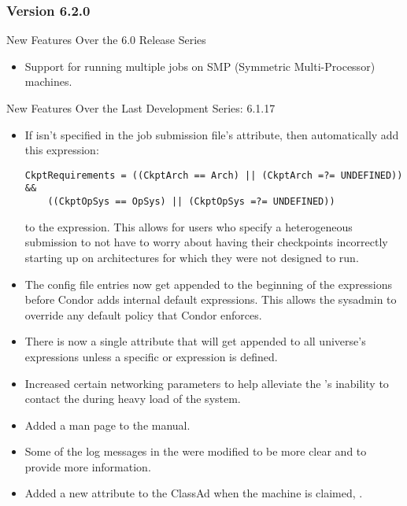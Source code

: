 \subsubsection{\label{sec:New-6-2-0}Version 6.2.0}

\noindent New Features Over the 6.0 Release Series
\begin{itemize}

\item Support for running multiple jobs on SMP (Symmetric Multi-Processor)
machines.

\end{itemize}

\noindent New Features Over the Last Development Series: 6.1.17
\begin{itemize}

\item If  isn't specified in the job submission file's
 attribute, then automatically add this expression:

\begin{verbatim}
CkptRequirements = ((CkptArch == Arch) || (CkptArch =?= UNDEFINED)) &&
	((CkptOpSys == OpSys) || (CkptOpSys =?= UNDEFINED))
\end{verbatim}

to the  expression. This allows for users who specify
a heterogeneous submission to not have to worry about having their checkpoints
incorrectly starting up on architectures for which they were not designed
to run.

\item The  config file entries now get
appended to the beginning of the expressions before Condor adds internal
default expressions.  This allows the sysadmin to override any default
policy that Condor enforces.

\item There is now a single  attribute
that will get appended to all universe's 
expressions unless a specific  or
 expression is defined.

\item Increased certain networking parameters to help alleviate the 
's inability to contact the  during heavy load
of the system.

\item Added a  man page to the manual.

\item Some of the log messages in the  were modified to
be more clear and to provide more information.

\item Added a new attribute to the  ClassAd when the
machine is claimed, .

\end{itemize}

